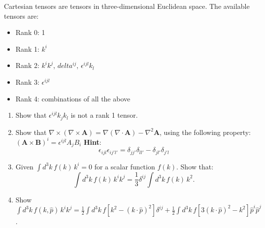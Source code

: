 Cartesian tensors are tensors in three-dimensional Euclidean space. The available tensors are: \begin{itemize}
    \item Rank 0: 1
    \item Rank 1: $k^i$
    \item Rank 2: $k^i k^j$, $delta^{ij}$, $\epsilon^{ijl} k_l$
    \item Rank 3: $\epsilon^{ijl}$
    \item Rank 4: combinations of all the above
\end{itemize}

\begin{enumerate}
    \item  Show that $\epsilon^{ijl} k_j k_l$ is not a rank 1 tensor.
    \item  Show that $\nabla \times (\nabla \times \mathbf{A}) = \nabla (\nabla \cdot \mathbf{A}) - \nabla^2 \mathbf{A}$, using the following property: $(\mathbf{A} \times \mathbf{B})^i = \epsilon^{ijl} A_{j}B_{i}$
          \textbf{Hint}:
          $$\epsilon_{ijl} \epsilon_{ij'l'} = \delta_{jj'} \delta_{ll'}- \delta_{jl'}\delta_{j'l} $$
    \item Given $\int d^3 k \, f(k) \, k^i = 0$ for a scalar function  $f(k)$. Show that:
          $$\int d^3 k \, f(k) \, k^i k^j = \frac{1}{3} \delta^{ij} \int d^3 k \, f(k) \, k^2.$$
    \item Show $\int d^3 k \, f(k, \hat{p}) \, k^i k^j = \frac{1}{2} \int d^3 k \, f\left[k^2 - (k \cdot \hat{p})^2\right] \delta^{ij} + \frac{1}{2} \int d^3 k \, f\left[3(k \cdot \hat{p})^2 - k^2\right] \hat{p}^i \hat{p}^j$.
\end{enumerate}